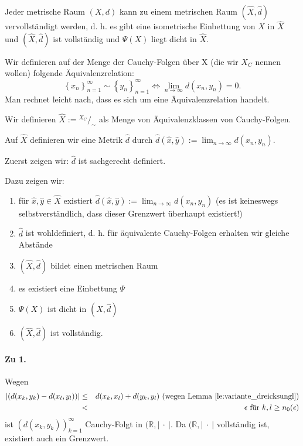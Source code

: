 \documentclass[10pt]{scrbook}
\begin{document}
\begin{Sa}
Jeder metrische Raum $(X, d)$ kann zu einem metrischen Raum $(\widehat{X}, \widehat{d})$ vervollständigt werden, d. h. es gibt eine isometrische Einbettung von $X$ in $\widehat{X}$ und $(\widehat{X}, \widehat{d})$ ist vollständig und $\Psi(X)$ liegt dicht in $\widehat{X}$.
\end{Sa}
\begin{bew}
Wir definieren auf der Menge der Cauchy-Folgen über X (die wir $X_C$ nennen wollen) folgende Äquivalenzrelation:
\begin{displaymath}
	\left\{x_n\right\}_{n=1}^\infty \sim \left\{y_n\right\}_{n=1}^\infty \Leftrightarrow \lim_{n\rightarrow \infty} d(x_n, y_n)=0.
\end{displaymath}
Man rechnet leicht nach, dass es sich um eine Äquivalenzrelation handelt.

Wir definieren $\widehat{X}:={}^{X_C}/_\sim$ als Menge von Äquivalenzklassen von Cauchy-Folgen.

Auf $\widehat{X}$ definieren wir eine Metrik $\widehat{d}$ durch $\widehat{d}(\widehat{x}, \widehat{y}):=\lim_{n\rightarrow \infty} d(x_n, y_n)$.

Zuerst zeigen wir: $\widehat{d}$ ist sachgerecht definiert.

Dazu zeigen wir:
\begin{enumerate}
	\item für $\widehat{x}, \widehat{y}\in \widehat{X}$ existiert $\widehat{d}(\widehat{x}, \widehat{y}):=\lim_{n\rightarrow \infty} d(x_n, y_n)$ (es ist keineswegs selbstverständlich, dass dieser Grenzwert überhaupt existiert!)
	\item $\widehat{d}$ ist wohldefiniert, d. h. für äquivalente Cauchy-Folgen erhalten wir gleiche Abstände
	\item $(\widehat{X}, \widehat{d})$ bildet einen metrischen Raum
	\item es existiert eine Einbettung $\Psi$
	\item $\Psi(X)$ ist dicht in $(\widehat{X}, \widehat{d})$
	\item $(\widehat{X}, \widehat{d})$ ist vollständig.
\end{enumerate}

\paragraph{Zu 1.} Wegen
\begin{eqnarray*}
\left|(d(x_k, y_k)-d(x_l, y_l))\right| & \leq & d(x_k, x_l)+d(y_k, y_l) \textnormal{ (wegen Lemma \ref{le:variante_dreicksungl})}\\
 & < & \epsilon \textnormal{ für }k, l\geq n_0(\epsilon)
\end{eqnarray*}
ist $(d(x_k, y_k))_{k=1}^\infty$ Cauchy-Folgt in $(\mathbb{R}, \left|\ \cdot\ \right|$. Da $(\mathbb{R}, \left|\ \cdot\ \right|$ vollständig ist, existiert auch ein Grenzwert.


\end{bew}
\end{document}
